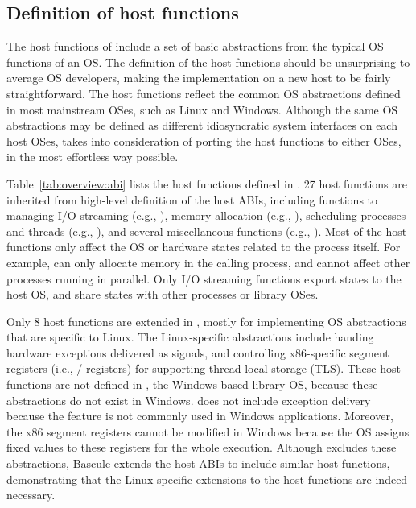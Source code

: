 \subsection{Definition of host functions}
\label{sec:overview:host:functions}


The host functions of \graphene{}
include a set of basic abstractions from the typical OS functions of an OS.
The definition of the host functions
should be unsurprising to average OS developers,
making the implementation on a new host to be fairly straightforward.
The host functions reflect the common OS abstractions defined in most mainstream OSes, such as Linux and Windows.
Although the same OS abstractions may be defined
as different idiosyncratic system interfaces on each host OSes,
\graphene{} takes into consideration of porting the host functions to either OSes, in the most effortless way possible.




Table~\ref{tab:overview:abi} lists the \palcalls{} host functions defined in \graphene{}.
27 host functions are inherited
from high-level definition of the \drawbridge{} host ABIs,
including functions to managing I/O streaming (e.g., ), memory allocation (e.g., ), scheduling processes and threads (e.g., ), and several miscellaneous functions (e.g., ).
Most of the host functions only affect the OS or hardware states
related to the process itself.
For example,  can only allocate memory in the calling process,
and cannot affect other processes running in parallel.
Only I/O streaming functions export states to the host OS, and share states with other processes or library OSes.



Only 8 host functions are extended in \graphene{}, mostly for implementing OS abstractions that are specific to Linux.
The Linux-specific abstractions include
handing hardware exceptions delivered as signals,
and controlling 
x86-specific segment registers (i.e., / registers)
for supporting thread-local storage (TLS).
These host functions are not defined in \drawbridge{}, the Windows-based library OS,
because these abstractions do not exist in Windows.
\drawbridge{} does not include exception delivery because the feature is
not commonly used in Windows applications.
Moreover, the x86 segment registers cannot be modified in Windows
because the OS assigns fixed values to these registers
for the whole execution.
Although \drawbridge{} excludes these abstractions, Bascule extends the host ABIs to include similar host functions,
demonstrating that the Linux-specific extensions
to the host functions are indeed necessary.




